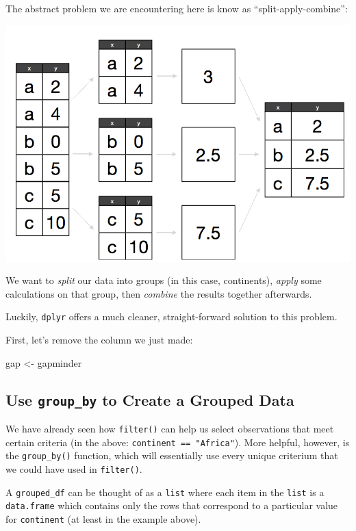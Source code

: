 \documentclass[
]{book}
\newenvironment{Shaded}{\begin{snugshade}}{\end{snugshade}}
\newcommand{\NormalTok}[1]{#1}
\newcommand{\StringTok}[1]{\textcolor[rgb]{0.31,0.60,0.02}{#1}}
\begin{document}
The abstract problem we are encountering here is know as ``split-apply-combine'':

\begin{center}\includegraphics[width=0.7\linewidth]{img/splitapply} \end{center}

We want to \emph{split} our data into groups (in this case, continents), \emph{apply} some calculations on that group, then \emph{combine} the results together afterwards.

Luckily, \texttt{dplyr} offers a much cleaner, straight-forward solution to this problem.

First, let's remove the column we just made:

\begin{Shaded}
\begin{Highlighting}[]
\NormalTok{gap <-}\StringTok{ }\NormalTok{gapminder}
\end{Highlighting}
\end{Shaded}

\hypertarget{use-group_by-to-create-a-grouped-data}{%
\subsection{\texorpdfstring{Use \texttt{group\_by} to Create a Grouped Data}{Use group\_by to Create a Grouped Data}}\label{use-group_by-to-create-a-grouped-data}}

We have already seen how \texttt{filter()} can help us select observations that meet certain criteria (in the above: \texttt{continent\ ==\ "Africa"}). More helpful, however, is the \texttt{group\_by()} function, which will essentially use every unique criterium that we could have used in \texttt{filter()}.

A \texttt{grouped\_df} can be thought of as a \texttt{list} where each item in the \texttt{list} is a \texttt{data.frame} which contains only the rows that correspond to a particular value for \texttt{continent} (at least in the example above).
\end{document}
